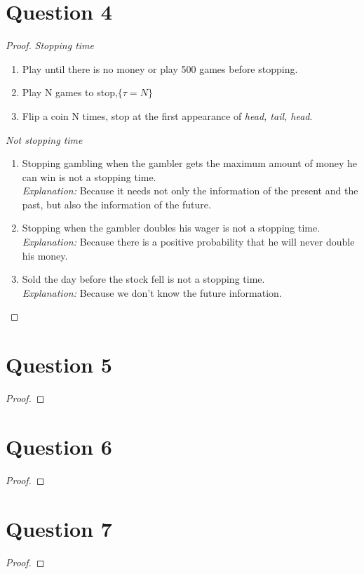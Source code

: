 \documentclass{article}
\begin{document}
\section*{Question 4}
    \begin{proof}
        \indent
        \textit{Stopping time}
        \begin{enumerate}
            \item Play until there is no money or play 500 games before stopping.
            \item Play N games to stop,$\{\tau=N\}$
            \item Flip a coin N times, stop at the first appearance of \textit{head, tail, head}.
        \end{enumerate}
        \textit{Not stopping time}
        \begin{enumerate}
            \item Stopping gambling when the gambler gets the maximum amount of money he can win is not a stopping time.\\
            \textit{Explanation:} Because it needs not only the information of the present and the past, but also the information of the future.
            \item Stopping when the gambler doubles his wager is not a stopping time.\\
            \textit{Explanation:} Because there is a positive probability that he will never double his money.
            \item Sold the day before the stock fell is not a stopping time.\\
            \textit{Explanation:} Because we don’t know the future information.
        \end{enumerate}
    \end{proof}

\section*{Question 5}
    \begin{proof}

    \end{proof}

\section*{Question 6}
    \begin{proof}

    \end{proof}

\section*{Question 7}
    \begin{proof}

    \end{proof}
\end{document}
